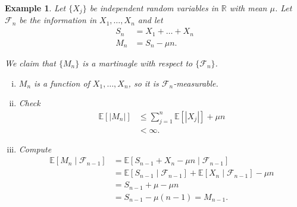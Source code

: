 \documentclass{tufte-handout}
\newcommand*\R{\mathbb{R}}
\newcommand*\E{\mathbb{E}}
\newtheorem{ex}[thm]{Example}
\theoremstyle{definition}
\begin{document}
\begin{ex}
	Let $\{X_j\}$ be independent random variables in $\R$ with mean $\mu$. Let $\mathscr{F}_n$ be the information in $X_1,\ldots,X_n$ and let 
	\begin{align*}
		S_n &= X_1+\ldots+X_n \\
		M_n &= S_n - \mu n
	.\end{align*}

	We claim that $\{M_n\}$ is a martinagle with respect to $\{\mathscr{F}_n\}$.

	\begin{enumerate}[(i)]
		\item $M_n$ is a function of $X_1,\ldots,X_n$, so it is $\mathscr{F}_n$-measurable. 
		\item Check
			\begin{align*}
				\E\left[\left| M_n \right|\right] &\le \sum\limits_{j=1}^{n} \E\left[\left| X_j \right|\right] + \mu n \\
												  &< \infty
			.\end{align*}
		\item Compute
			\begin{align*}
				\E\left[M_n \mid \mathscr{F}_{n-1}\right] &= \E\left[S_{n-1} + X_n - \mu n \mid \mathscr{F}_{n-1}\right]  \\
				&= \E\left[S_{n-1} \mid \mathscr{F}_{n-1}\right] + \E\left[X_n \mid \mathscr{F}_{n-1}\right] - \mu n \\
				&= S_{n-1} + \mu - \mu n \\
				&= S_{n-1} - \mu(n-1) = M_{n-1}
			.\end{align*}
	\end{enumerate}
\end{ex}
\end{document}
